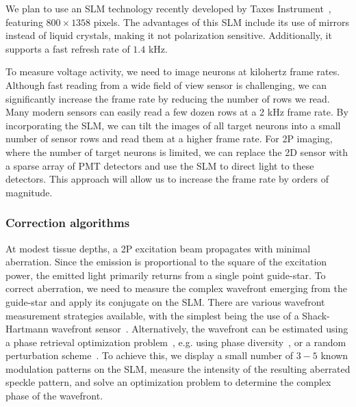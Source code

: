 
We plan to use an SLM technology recently developed by Taxes Instrument~\cite{PLM-TI_2019}, featuring $800 \times 1358$ pixels. The advantages of this SLM include its use of mirrors instead of liquid crystals, making it not polarization sensitive. Additionally, it supports a fast refresh rate of $1.4$ kHz.




To measure voltage activity, we need to image neurons at kilohertz frame rates. Although fast reading from a wide field of view sensor is challenging, we can significantly increase the frame rate by reducing the number of rows we read. Many modern sensors can easily read a few dozen rows at a 2 kHz frame rate. By incorporating the SLM, we can tilt the images of all target neurons into a small number of sensor rows and read them at a higher frame rate.
For 2P imaging, where the number of target neurons is limited, we can replace the 2D sensor with a sparse array of PMT detectors and use the SLM to direct light to these detectors. This approach will allow us to increase the frame rate by orders of magnitude.




\subsubsection{Correction algorithms}
 At modest tissue depths, a 2P excitation beam propagates with minimal aberration. Since the emission is proportional to the square of the excitation power, the emitted light primarily returns from a single point guide-star. To correct aberration, we need to measure the complex wavefront emerging from the guide-star and apply its conjugate on the SLM.
There are various wavefront measurement strategies available, with the simplest being the use of a Shack-Hartmann wavefront sensor~\cite{Platt2001HistoryAP,Aviles-Espinosa:11,Cha2010SHwavefrontsensor}. Alternatively, the wavefront can be estimated using a  phase retrieval optimization problem~\cite{candes2015}, e.g. using phase diversity~\cite{Dean2003,Robert1982}, or a random perturbation scheme~\cite{WISH2019}.
To achieve this, we display a small number of $3-5$ known modulation patterns on the SLM, measure the intensity of the resulting aberrated speckle pattern, and solve an optimization problem to determine the complex phase of the wavefront.

